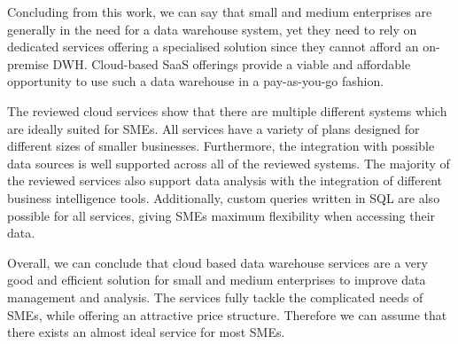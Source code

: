 \documentclass[../paper.tex]{subfiles}
\begin{document}
Concluding from this work, we can say that small and medium enterprises are
generally in the need for a data warehouse system, yet they need to rely on
dedicated services offering a specialised solution since they cannot afford
an on-premise DWH. Cloud-based SaaS offerings provide a viable and affordable
opportunity to use such a data warehouse in a pay-as-you-go fashion.

The reviewed cloud services show that there are multiple different systems
which are ideally suited for SMEs. All services have a variety of plans
designed for different sizes of smaller businesses. Furthermore, the
integration with possible data sources is well supported across all of the
reviewed systems. The majority of the reviewed services also support data
analysis with the integration of different business intelligence tools.
Additionally, custom queries written in SQL are also possible for all services,
giving SMEs maximum flexibility when accessing their data.

Overall, we can conclude that cloud based data warehouse services are a very
good and efficient solution for small and medium enterprises to improve data
management and analysis. The services fully tackle the complicated needs of
SMEs, while offering an attractive price structure. Therefore we can assume
that there exists an almost ideal service for most SMEs.
\end{document}
